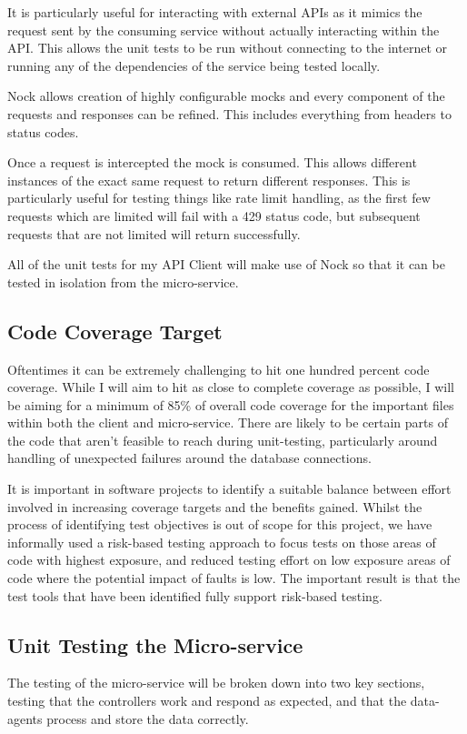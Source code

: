 It is particularly useful for interacting with external APIs as it mimics the request sent by the consuming service without actually interacting within the API. This allows the unit tests to be run without connecting to the internet or running any of the dependencies of the service being tested locally. 

Nock allows creation of highly configurable mocks and every component of the requests and responses can be refined. This includes everything from headers to status codes.

Once a request is intercepted the mock is consumed. This allows different instances of the exact same request to return different responses. This is particularly useful for testing things like rate limit handling, as the first few requests which are limited will fail with a 429 status code, but subsequent requests that are not limited will return successfully.

All of the unit tests for my API Client will make use of Nock so that it can be tested in isolation from the micro-service.
\subsection{Code Coverage Target}
Oftentimes it can be extremely challenging to hit one hundred percent code coverage. While I will aim to hit as close to complete coverage as possible, I will be aiming for a minimum of 85\% of overall code coverage for the important files within both the client and micro-service. There are likely to be certain parts of the code that aren't feasible to reach during unit-testing, particularly around handling of unexpected failures around the database connections.

It is important in software projects to identify a suitable balance between effort involved in increasing coverage targets and the benefits gained. Whilst the process of identifying test objectives is out of scope for this project, we have informally used a risk-based testing approach \cite{Amland} to focus tests on those areas of code with highest exposure, and reduced testing effort on low exposure areas of code where the potential impact of faults is low. The important result is that the test tools that have been identified fully support risk-based testing.
\subsection{Unit Testing the Micro-service}
The testing of the micro-service will be broken down into two key sections, testing that the controllers work and respond as expected, and that the data-agents process and store the data correctly.
